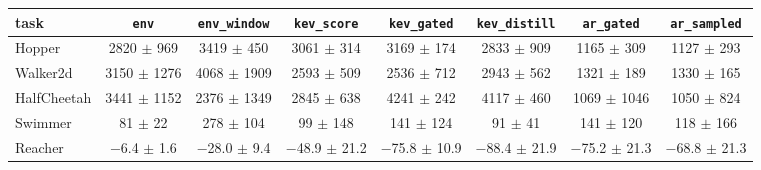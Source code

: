 \begin{tabular}{@{}lccccccc@{}}
\toprule
 task & \texttt{env} & \texttt{env\_window} & \texttt{kev\_score} & \texttt{kev\_gated} & \texttt{kev\_distill} & \texttt{ar\_gated} & \texttt{ar\_sampled} \\ \midrule
Hopper & 2820 $\pm$ 969 & 3419 $\pm$ 450 & 3061 $\pm$ 314 & 3169 $\pm$ 174 & 2833 $\pm$ 909 & 1165 $\pm$ 309 & 1127 $\pm$ 293 \\
Walker2d & 3150 $\pm$ 1276 & 4068 $\pm$ 1909 & 2593 $\pm$ 509 & 2536 $\pm$ 712 & 2943 $\pm$ 562 & 1321 $\pm$ 189 & 1330 $\pm$ 165 \\
HalfCheetah & 3441 $\pm$ 1152 & 2376 $\pm$ 1349 & 2845 $\pm$ 638 & 4241 $\pm$ 242 & 4117 $\pm$ 460 & 1069 $\pm$ 1046 & 1050 $\pm$ 824 \\
Swimmer & 81 $\pm$ 22 & 278 $\pm$ 104 & 99 $\pm$ 148 & 141 $\pm$ 124 & 91 $\pm$ 41 & 141 $\pm$ 120 & 118 $\pm$ 166 \\
Reacher & $-$6.4 $\pm$ 1.6 & $-$28.0 $\pm$ 9.4 & $-$48.9 $\pm$ 21.2 & $-$75.8 $\pm$ 10.9 & $-$88.4 $\pm$ 21.9 & $-$75.2 $\pm$ 21.3 & $-$68.8 $\pm$ 21.3 \\
\bottomrule
\end{tabular}

